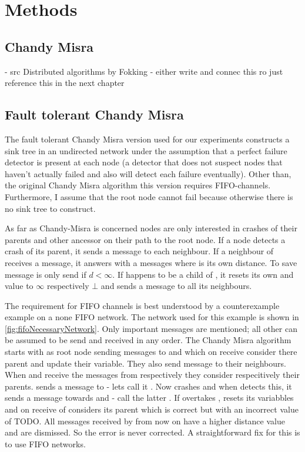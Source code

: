\section{Methods}  %
\label{sec:methods}
\subsection{Chandy Misra}
 - src Distributed algorithms by Fokking
 - either write and connec this ro just reference this in the next chapter
\subsection {Fault tolerant Chandy Misra}
  The fault tolerant Chandy Misra version used for our experiments constructs a sink tree in an undirected network under the assumption that a perfect failure detector is present at each node (a detector that does not suspect nodes that haven't actually failed and also will detect each failure eventually). 
  Other than, the original Chandy Misra algorithm this version requires FIFO-channels.
  Furthermore, I assume that the root node cannot fail because otherwise there is no sink tree to construct.
  
  As far as Chandy-Misra is concerned nodes are only interested in crashes of their parents and other ancessor on their path to the root node.
  If a node  detects a crash of its parent, it sends a  message to each neighbour. 
  If a neighbour  of  receives a  message, it answers with a  messages where  is its own distance. 
  To save message  is only send if $d < \infty $.
  If  happens to be a child of , it resets its own  and  value to $\infty$ respectively $\bot$ and sends a  message to all its neighbours.
  
  The requirement for FIFO channels is best understood by a counterexample example on a none FIFO network.
  The network used for this example is shown in \cref{fig:fifoNecessaryNetwork}. 
  Only important messages are mentioned; all other can be assumed to be send and received in any order.
  The Chandy Misra algorithm starts with  as root node sending  messages to  and  which on receive consider  there parent and update their  variable.
  They also send  message to their neighbours. 
  When  and  receive the  messages from  respectively  they consider  respecitively  their parents.
   sends a  message to  - lets call it .
  Now  crashes and when  detects this, it sends a  message towards  and  - call the latter .
  If  overtakes ,  resets its variabbles and on receive of  considers  its parent which is correct but with an incorrect  value of TODO.
  All  messages received by  from now on have a higher distance value and are dismissed. 
  So the error is never corrected.
  A straightforward fix for this is to use FIFO networks.
  
